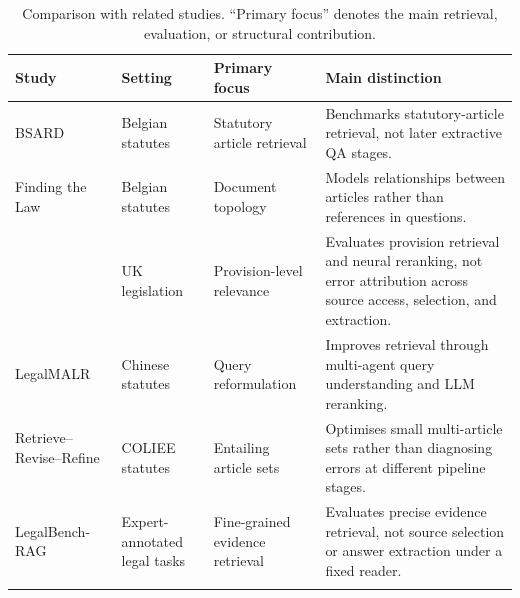 \documentclass[pdflatex,sn-basic]{sn-jnl}%
\theoremstyle{thmstyleone}%
\theoremstyle{thmstyletwo}%
\theoremstyle{thmstylethree}%
\begin{document}
\begin{table}[!htbp]
    \caption{Comparison with related studies. ``Primary focus'' denotes the
    main retrieval, evaluation, or structural contribution.}
    \label{tab:positioning}
    \centering
    \scriptsize
    \setlength{\tabcolsep}{3pt}
    \renewcommand{\arraystretch}{1.22}
    \begin{tabular}{@{}
        >{\raggedright\arraybackslash}p{2.7cm}
        >{\raggedright\arraybackslash}p{1.7cm}
        >{\raggedright\arraybackslash}p{1.9cm}
        >{\raggedright\arraybackslash}p{5.1cm}@{}}
        \toprule
        Study & Setting & Primary focus & Main distinction \\
        \midrule

        BSARD~\citep{louisSpanakisBSARD2022}
        & Belgian statutes
        & Statutory article retrieval
        & Benchmarks statutory-article retrieval, not later extractive QA
        stages. \\
        \addlinespace[2pt]

        Finding the Law~\citep{louisFindingLaw2023}
        & Belgian statutes
        & Document topology
        & Models relationships between articles rather than references in
        questions. \\
        \addlinespace[2pt]

        \citet{alshehri2026neural}
        & UK legislation
        & Provision-level relevance
        & Evaluates provision retrieval and neural reranking, not error
        attribution across source access, selection, and extraction. \\
        \addlinespace[2pt]

        LegalMALR~\citep{li2026legalmalr}
        & Chinese statutes
        & Query reformulation
        & Improves retrieval through multi-agent query understanding and LLM
        reranking. \\
        \addlinespace[2pt]

        Retrieve--Revise--\newline Refine%
        ~\citep{nguyen2025retrievereviserefine}
        & COLIEE statutes
        & Entailing article sets
        & Optimises small multi-article sets rather than diagnosing errors at
        different pipeline stages. \\
        \addlinespace[2pt]

        LegalBench-RAG~\citep{pipitone2024legalbenchrag}
        & Expert-annotated legal tasks
        & Fine-grained evidence retrieval
        & Evaluates precise evidence retrieval, not source selection or answer
        extraction under a fixed reader. \\
        \addlinespace[2pt]


\end{tabular}
\end{table}
\end{document}
